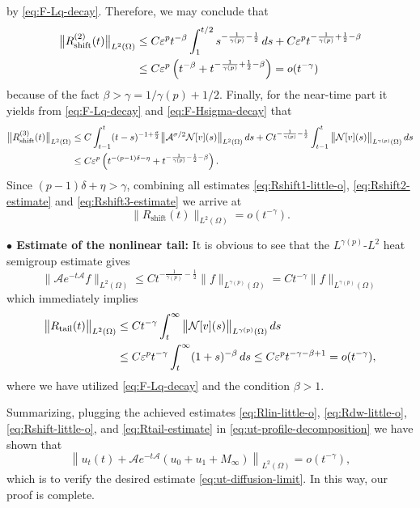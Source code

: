 \documentclass[a4paper,11pt]{article} %
\theoremstyle{remark}
\theoremstyle{definition}
\numberwithin{equation}{section}
\begin{document}
by \eqref{eq:F-Lq-decay}. Therefore, we may conclude that
\begin{align}
\big\|R_{\mathrm{shift}}^{(2)}(t)\big\|_{L^2(\Omega)}
&\le
C\varepsilon^p t^{-\beta}
\int_1^{t/2}s^{-\frac{1}{\gamma(p)}-\frac{1}{2}}\,ds
+
C\varepsilon^p t^{-\frac{1}{\gamma(p)}+\frac{1}{2}-\beta} \notag\\
&\le
C\varepsilon^p
\left(
t^{-\beta}+t^{-\frac{1}{\gamma(p)}+\frac{1}{2}-\beta}
\right)= o(t^{-\gamma})
\label{eq:Rshift2-estimate}
\end{align}
because of the fact \(\beta>\gamma= 1/\gamma(p)+1/2\). Finally, for the near-time part it yields from \eqref{eq:F-Lq-decay} and \eqref{eq:F-Hsigma-decay} that
\begin{align}
\big\|R_{\mathrm{shift}}^{(3)}(t)\big\|_{L^2(\Omega)}
&\le
C\int_{t-1}^{t}
(t-s)^{-1+\frac{\sigma}{2}}
\big\|\mathcal{A}^{\sigma/2}\mathcal{N}[v](s)\big\|_{L^2(\Omega)}\,ds +Ct^{-\frac{1}{\gamma(p)}-\frac{1}{2}} 
\int_{t-1}^{t}\big\|\mathcal{N}[v](s)\big\|_{L^{\gamma(p)}(\Omega)}\,ds \notag\\
&\le
C\varepsilon^p
\left(
t^{-(p-1)\delta-\eta}
+
t^{-\frac{1}{\gamma(p)}-\frac{1}{2}-\beta} 
\right).
\label{eq:Rshift3-estimate}
\end{align}
Since \((p-1)\delta+\eta>\gamma\), combining all estimates \eqref{eq:Rshift1-little-o}, \eqref{eq:Rshift2-estimate} and \eqref{eq:Rshift3-estimate} we arrive at
\begin{equation}
\label{eq:Rshift-little-o}
\big\|R_{\mathrm{shift}}(t)\big\|_{L^2(\Omega)}
=
o(t^{-\gamma}).
\end{equation}

\noindent\textbf{$\bullet$ Estimate of the nonlinear tail:} It is obvious to see that the \(L^{\gamma(p)}\)-\(L^2\) heat semigroup estimate gives
\[
\big\|\mathcal{A}e^{-t\mathcal{A}}f\big\|_{L^2(\Omega)}
\le
Ct^{-\frac{1}{\gamma(p)}-\frac{1}{2}} \|f\|_{L^{\gamma(p)}(\Omega)}
=
Ct^{-\gamma}\|f\|_{L^{\gamma(p)}(\Omega)}
\]
which immediately implies
\begin{align}
\big\|R_{\mathrm{tail}}(t)\big\|_{L^2(\Omega)}
&\le
Ct^{-\gamma}
\int_t^\infty\big\|\mathcal{N}[v](s)\big\|_{L^{\gamma(p)}(\Omega)}\,ds \notag\\
&\le
C\varepsilon^p t^{-\gamma}
\int_t^\infty (1+s)^{-\beta}\,ds \le
C\varepsilon^p t^{-\gamma-\beta+1}=
o(t^{-\gamma}),
\label{eq:Rtail-estimate}
\end{align}
where we have utilized \eqref{eq:F-Lq-decay} and the condition \(\beta>1\). \medskip

Summarizing, plugging the achieved estimates \eqref{eq:Rlin-little-o},
\eqref{eq:Rdw-little-o},
\eqref{eq:Rshift-little-o}, and
\eqref{eq:Rtail-estimate} in
\eqref{eq:ut-profile-decomposition} we have shown that
\[
\left\|
u_t(t)+\mathcal{A}e^{-t\mathcal{A}}(u_0+u_1+M_\infty)
\right\|_{L^2(\Omega)}
=
o(t^{-\gamma}),
\]
which is to verify the desired estimate \eqref{eq:ut-diffusion-limit}. In this way, our proof is complete.
\end{document}
